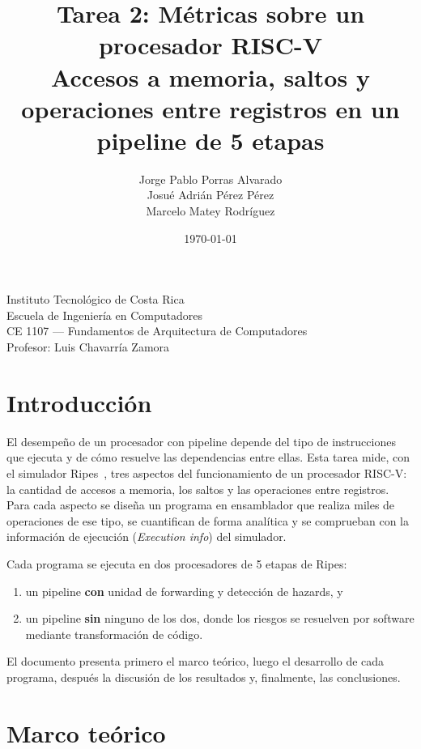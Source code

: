 \documentclass[11pt,a4paper]{article}
\title{Tarea 2: M\'etricas sobre un procesador RISC-V\\[2pt]
\large Accesos a memoria, saltos y operaciones entre registros en un pipeline de 5 etapas}
\author{Jorge Pablo Porras Alvarado \\ Josué Adrián Pérez Pérez \\ Marcelo Matey Rodr\'iguez}
\date{\today}
\begin{document}
\maketitle

\begin{center}
Instituto Tecnol\'ogico de Costa Rica \\
Escuela de Ingenier\'ia en Computadores \\
CE 1107 --- Fundamentos de Arquitectura de Computadores \\
Profesor: Luis Chavarr\'ia Zamora
\end{center}

\vspace{1em}

\section{Introducci\'on}

El desempe\~no de un procesador con pipeline depende del tipo de instrucciones
que ejecuta y de c\'omo resuelve las dependencias entre ellas. Esta tarea mide,
con el simulador Ripes~\cite{ripes}, tres aspectos del funcionamiento de un
procesador RISC-V: la cantidad de accesos a memoria, los saltos y las
operaciones entre registros. Para cada aspecto se dise\~na un programa en
ensamblador que realiza miles de operaciones de ese tipo, se cuantifican de
forma anal\'itica y se comprueban con la informaci\'on de ejecuci\'on
(\emph{Execution info}) del simulador.

Cada programa se ejecuta en dos procesadores de 5 etapas de Ripes:

\begin{enumerate}
  \item un pipeline \textbf{con} unidad de forwarding y detecci\'on de hazards, y
  \item un pipeline \textbf{sin} ninguno de los dos, donde los riesgos se
        resuelven por software mediante transformaci\'on de c\'odigo.
\end{enumerate}

El documento presenta primero el marco te\'orico, luego el desarrollo de cada
programa, despu\'es la discusi\'on de los resultados y, finalmente, las
conclusiones.

\section{Marco te\'orico}
\end{document}
